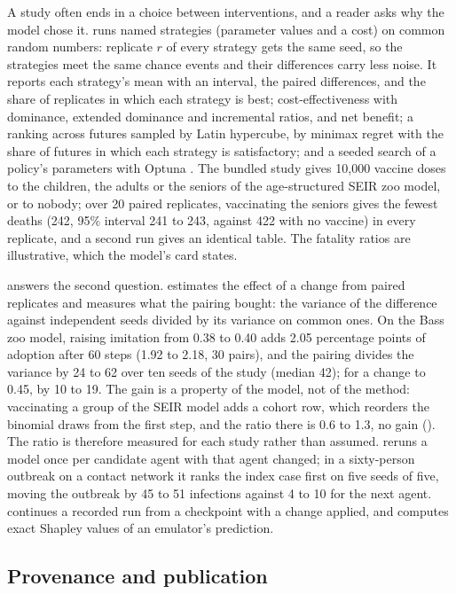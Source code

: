 A study often ends in a choice between interventions, and a reader asks why the model chose
it.  runs named strategies (parameter values and a cost) on common random
numbers: replicate $r$ of every strategy gets the same seed, so the strategies meet the same
chance events and their differences carry less noise. It reports each strategy's mean with an
interval, the paired differences, and the share of replicates in which each strategy is best;
cost-effectiveness with dominance, extended dominance and incremental ratios, and net benefit;
a ranking across futures sampled by Latin hypercube, by minimax regret \citep{savage1951theory}
with the share of futures in which each strategy is satisfactory; and a seeded search of a
policy's parameters with Optuna \citep{akiba2019optuna}. The bundled study gives 10,000 vaccine
doses to the children, the adults or the seniors of the age-structured SEIR zoo model, or to
nobody; over 20 paired replicates, vaccinating the seniors gives the fewest deaths (242, 95\%
interval 241 to 243, against 422 with no vaccine) in every replicate, and a second run gives
an identical table. The fatality ratios are illustrative, which the model's card states.

 answers the second question.  estimates the
effect of a change from paired replicates and measures what the pairing bought: the variance
of the difference against independent seeds divided by its variance on common ones. On the
Bass zoo model, raising imitation from 0.38 to 0.40 adds 2.05 percentage points of adoption
after 60 steps (1.92 to 2.18, 30 pairs), and the pairing divides the variance by 24 to 62 over
ten seeds of the study (median 42); for a change to 0.45, by 10 to 19. The gain is a property
of the model, not of the method: vaccinating a group of the SEIR model adds a cohort row, which
reorders the binomial draws from the first step, and the ratio there is 0.6 to 1.3, no gain
(). The ratio is therefore measured for each study rather than
assumed.  reruns a model once per candidate agent with that agent changed; in a
sixty-person outbreak on a contact network it ranks the index case first on five seeds of
five, moving the outbreak by 45 to 51 infections against 4 to 10 for the next agent.
 continues a recorded run from a checkpoint with a change applied, and
 computes exact Shapley values \citep{shapley1953value} of an emulator's
prediction.

\subsection{Provenance and publication}

